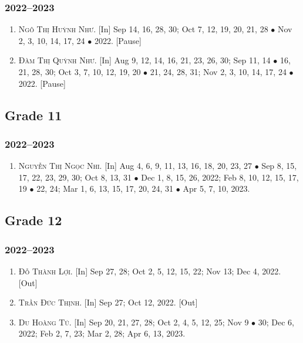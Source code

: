 \documentclass{article}
\begin{document}
\subsubsection{2022--2023}

\begin{enumerate}
	\item \textsc{Ngô Thị Huỳnh Như.} \textsf{[In]} Sep 14, 16, 28, 30; Oct 7, 12, 19, 20, 21, 28 $\bullet$ Nov 2, 3, 10, 14, 17, 24 $\bullet$ 2022. \textsf{[Pause]}
	\item \textsc{Đàm Thị Quỳnh Như.} \textsf{[In]} Aug 9, 12, 14, 16, 21, 23, 26, 30; Sep 11, 14 $\bullet$ 16, 21, 28, 30; Oct 3, 7, 10, 12, 19, 20 $\bullet$ 21, 24, 28, 31; Nov 2, 3, 10, 14, 17, 24 $\bullet$ 2022. \textsf{[Pause]}
\end{enumerate}

\subsection{Grade 11}

\subsubsection{2022--2023}

\begin{enumerate}
	\item \textsc{Nguyễn Thị Ngọc Nhi.} \textsf{[In]} Aug 4, 6, 9, 11, 13, 16, 18, 20, 23, 27 $\bullet$ Sep 8, 15, 17, 22, 23, 29, 30; Oct 8, 13, 31 $\bullet$ Dec 1, 8,  15, 26, 2022; Feb 8, 10, 12, 15, 17, 19 $\bullet$ 22, 24; Mar 1, 6, 13, 15, 17, 20, 24, 31 $\bullet$ Apr 5, 7, 10, 2023.
\end{enumerate}

\subsection{Grade 12}

\subsubsection{2022--2023}

\begin{enumerate}
	\item \textsc{Đỗ Thành Lợi.} \textsf{[In]} Sep 27, 28; Oct 2, 5, 12, 15, 22; Nov 13; Dec 4, 2022. \textsf{[Out]}
	\item \textsc{Trần Đức Thịnh.} \textsf{[In]} Sep 27; Oct 12, 2022.  \textsf{[Out]}
	\item \textsc{Du Hoàng Tú.} \textsf{[In]} Sep 20, 21, 27, 28; Oct 2, 4, 5, 12, 25; Nov 9 $\bullet$ 30; Dec 6, 2022; Feb 2, 7, 23; Mar 2, 28; Apr 6, 13, 2023.
\end{enumerate}
\end{document}
